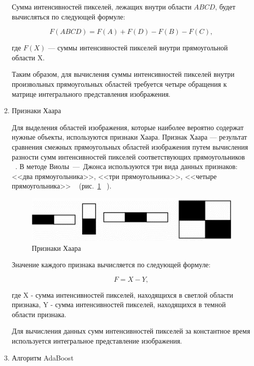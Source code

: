\begin{enumerate}[label=\arabic*.]
    Сумма интенсивностей пикселей, лежащих внутри области $ABCD$, будет вычисляться по следующей формуле:

    \begin{equation}
        F(ABCD) = F(A) + F(D) - F(B) - F(C),
    \end{equation}

    где $F(X)$ --- суммы интенсивностей пикселей внутри прямоугольной области X.

    Таким образом, для вычисления суммы интенсивностей пикселей внутри произвольных прямоугольных областей требуется четыре обращения к матрице интегрального представления изображения.
    
    \item Признаки Хаара

    Для выделения областей изображения, которые наиболее вероятно содержат нужные объекты, используются признаки Хаара. Признак Хаара --- результат сравнения смежных прямоугольных областей изображения путем вычисления разности сумм интенсивностей пикселей соответствующих прямоугольников ~\cite{novosibirsk}. 
    В методе Виолы~---~Джонса используются три вида данных признаков: <<два прямоугольника>>, <<три прямоугольника>>, <<четыре прямоугольника>> ~\cite{viola} (рис.~\ref{img:haar} ~\cite{astrahan}).

    \begin{figure}[h]
	\centering
	\includegraphics[height=0.1\textheight]{img/haar.jpg}
	\caption{Признаки Хаара}
    \label{img:haar}
    \end{figure}

    Значение каждого признака вычисляется по следующей формуле:

    \begin{equation}
        F = X - Y,
    \end{equation}

    где X - сумма интенсивностей пикселей, находящихся в светлой области признака, Y - сумма интенсивностей пикселей, находящихся в темной области признака.

    Для вычисления данных сумм интенсивностей пикселей за константное время используется интегральное представление изображения.
    
    \item Алгоритм AdaBoost


\end{enumerate}
